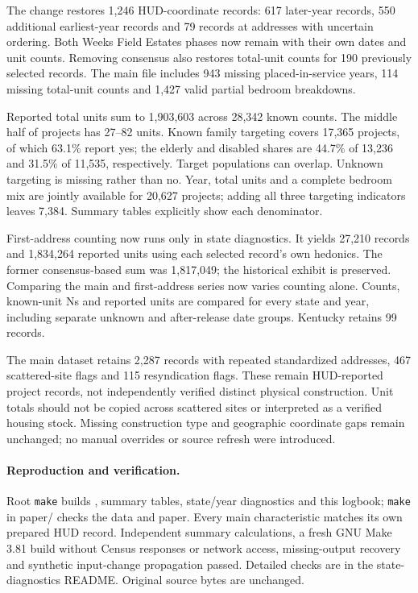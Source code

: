 \documentclass[11pt]{article}
\begin{document}
\begin{center}\small

\end{center}

The change restores 1,246 HUD-coordinate records: 617 later-year records, 550
additional earliest-year records and 79 records at addresses with uncertain
ordering. Both Weeks Field Estates phases now remain with their own dates and
unit counts. Removing consensus also restores total-unit counts for 190 previously
selected records. The main file includes 943 missing placed-in-service years,
114 missing total-unit counts and 1,427 valid partial bedroom breakdowns.

Reported total units sum to 1,903,603 across 28,342 known counts. The middle half
of projects has 27--82 units. Known family targeting covers 17,365 projects, of
which 63.1\% report yes; the elderly and disabled shares are 44.7\% of 13,236 and
31.5\% of 11,535, respectively. Target populations can overlap. Unknown targeting
is missing rather than no. Year, total units and a complete bedroom mix are
jointly available for 20,627 projects; adding all three targeting indicators leaves
7,384. Summary tables explicitly show each denominator.

First-address counting now runs only in state diagnostics. It yields 27,210
records and 1,834,264 reported units using each selected record's own hedonics.
The former consensus-based sum was 1,817,049; the historical exhibit is preserved.
Comparing the main and first-address series now varies counting alone. Counts,
known-unit Ns and reported units are compared for every state and year, including
separate unknown and after-release date groups. Kentucky retains 99 records.

The main dataset retains 2,287 records with repeated standardized addresses,
467 scattered-site flags and 115 resyndication flags. These remain HUD-reported
project records, not independently verified distinct physical construction.
Unit totals should not be copied across scattered sites or interpreted as a
verified housing stock. Missing construction type and geographic coordinate gaps
remain unchanged; no manual overrides or source refresh were introduced.

\paragraph{Reproduction and verification.} Root \texttt{make} builds
, summary tables, state/year diagnostics
and this logbook; \texttt{make} in paper/ checks the data and paper. Every main
characteristic matches its own prepared HUD record. Independent summary calculations,
a fresh GNU Make 3.81 build without Census responses or network access, missing-output
recovery and synthetic input-change propagation passed. Detailed checks are in
the state-diagnostics README. Original source bytes are unchanged.
\clearpage
\end{document}
